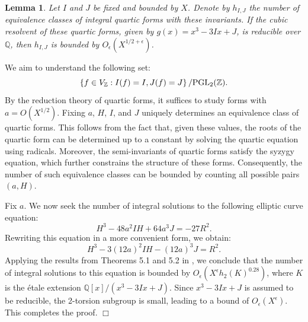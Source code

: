 \documentclass{article}
\def\Z{{\mathbb Z}}
\def\PGL{{\rm PGL}}
\def\Z{{\mathbb Z}}
\newtheorem{lemma}[theorem]{Lemma}
\newenvironment{proof}{\noindent {\bf Proof:}}{$\Box$ \vspace{2 ex}}
\begin{document}
\begin{lemma}\label{h_IJ}
Let $I$ and $J$ be fixed and bounded by $X$. Denote by $h_{I,J}$ the number of equivalence classes of integral quartic forms with these invariants. If the cubic resolvent of these quartic forms, given by $g(x) = x^3 - 3Ix + J$, is reducible over $\mathbb{Q}$, then $h_{I,J}$ is bounded by $O_{\epsilon}(X^{1/2+\epsilon})$.
\end{lemma}
\begin{proof}
We aim to understand the following set:
\begin{equation*}
    \left\{f \in V_{\Z} : I(f) = I, J(f) = J \right\} / \PGL_2(\Z).
\end{equation*}
By the reduction theory of quartic forms, it suffices to study forms with $a = O(X^{1/2})$. Fixing $a$, $H$, $I$, and $J$ uniquely determines an equivalence class of quartic forms. This follows from the fact that, given these values, the roots of the quartic form can be determined up to a constant by solving the quartic equation using radicals. Moreover, the semi-invariants of quartic forms satisfy the syzygy equation, which further constrains the structure of these forms. Consequently, the number of such equivalence classes can be bounded by counting all possible pairs $(a, H)$.  

Fix $a$. We now seek the number of integral solutions to the following elliptic curve equation:
\begin{equation*}
   H^3 - 48a^2IH + 64a^3J = -27R^2.
\end{equation*}
Rewriting this equation in a more convenient form, we obtain:
\begin{equation*}
    H^3 - 3(12a)^2IH - (12a)^3J = R^2.
\end{equation*}
Applying the results from Theorems 5.1 and 5.2 in \cite{elliptic-integral}, we conclude that the number of integral solutions to this equation is bounded by $O_{\epsilon}(X^{\epsilon} h_2(K)^{0.28})$, where $K$ is the étale extension $\mathbb{Q}[x]/(x^3 - 3Ix + J)$. Since $x^3 - 3Ix + J$ is assumed to be reducible, the 2-torsion subgroup is small, leading to a bound of $O_{\epsilon}(X^{\epsilon})$. This completes the proof.
\end{proof}
\end{document}
